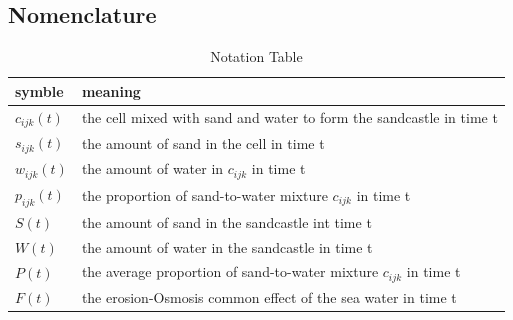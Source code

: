 \documentclass[12pt]{article}
\begin{document}
\subsection{Nomenclature}
\begin{table}[H]
    \caption{Notation Table}
    \vspace{10pt}
    \centering
    \begin{tabular}{ |l| p{5cm}| }
        \hline
        symble       & meaning                                                             \\
        \hline
        $c_{ijk}(t)$ & the cell mixed with sand and water to form the sandcastle in time t \\
        $s_{ijk}(t)$ & the amount of sand in the cell in time t                            \\
        $w_{ijk}(t)$ & the amount of water in  $c_{ijk}$ in time t                         \\
        $p_{ijk}(t)$ & the proportion of sand-to-water mixture $c_{ijk}$ in time t         \\
        $S(t)$       & the amount of sand in the sandcastle	int time t                      \\
        $W(t)$       & the amount of water in the sandcastle in time t                     \\
        $P(t)$       & the average proportion of sand-to-water mixture $c_{ijk}$ in time t \\
        $F(t)$       & the erosion-Osmosis common effect of the sea water in time t        \\
        \hline
    \end{tabular}
    \label{bs1}
\end{table}
\end{document}
